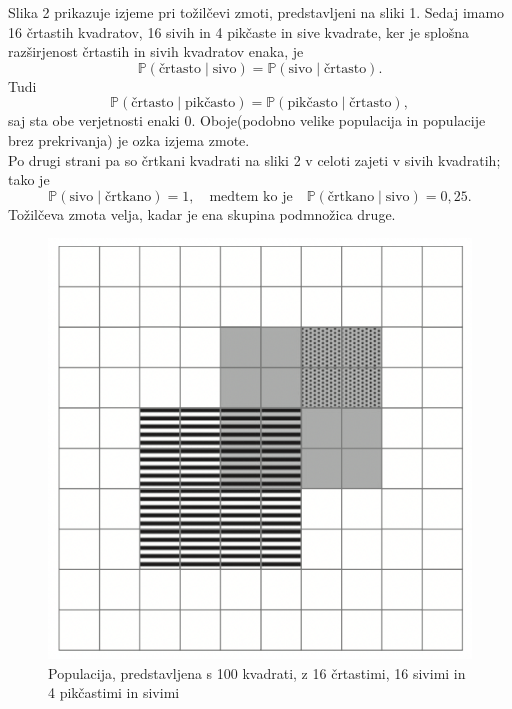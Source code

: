 \documentclass[a4paper,12pt]{article}
\begin{document}
 Slika 2 prikazuje izjeme pri tožilčevi zmoti, predstavljeni na sliki 1. Sedaj imamo 16 črtastih kvadratov, 16 sivih in 4 pikčaste in sive kvadrate, ker je splošna 
 razširjenost črtastih in sivih kvadratov enaka, je
 \[ \mathbb{P}(\text{črtasto} \mid \text{sivo}) = \mathbb{P}(\text{sivo} \mid \text{črtasto}).\]
Tudi 
\[\mathbb{P}(\text{črtasto} \mid \text{pikčasto}) = \mathbb{P}(\text{pikčasto} \mid \text{črtasto}),\]
saj sta obe verjetnosti enaki $0$. Oboje(podobno velike populacija in populacije brez prekrivanja) je ozka izjema zmote. \\
Po drugi strani pa so črtkani kvadrati na sliki 2 v celoti zajeti v sivih kvadratih; tako je 
\[\mathbb{P}(\text{sivo} \mid \text{črtkano}) = 1, \quad \text{medtem ko je} \quad \mathbb{P}(\text{črtkano} \mid \text{sivo}) = 0,25. \]
Tožilčeva zmota velja, kadar je ena skupina podmnožica druge.

\begin{figure}[!ht]
    \centering
    \label{fig:slika1}
    \includegraphics[scale=0.45]{slika2.png}
    \caption{Populacija, predstavljena s 100 kvadrati, z 16 črtastimi, 16 sivimi in 4 pikčastimi in sivimi}\vspace{2mm}
 \end{figure}
\end{document}

